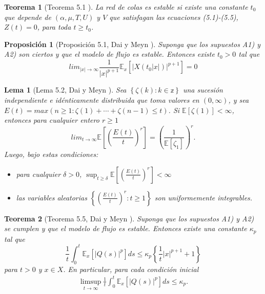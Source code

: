 \documentclass{article}
\newtheorem{Teo}{Teorema}
\newtheorem{Prop}{Proposición}
\newtheorem{Lemma}{Lema}
\newcommand{\esp}{\mathbb{E}}
\begin{document}
\begin{Teo}[Teorema 5.1 \cite{Chen}]\label{Tma.5.1.Chen}
La red de colas es estable si existe una constante $t_{0}$ que
depende de $\left(\alpha,\mu,T,U\right)$ y $V$ que satisfagan las
ecuaciones (5.1)-(5.5), $Z\left(t\right)=0$, para toda $t\geq
t_{0}$.
\end{Teo}

\begin{Prop}[Proposici\'on 5.1, Dai y Meyn \cite{DaiSean}]\label{Prop.5.1.DaiSean}
Suponga que los supuestos A1) y A2) son ciertos y que el modelo de flujo es estable. Entonces existe $t_{0}>0$ tal que
\begin{equation}
lim_{|x|\rightarrow\infty}\frac{1}{|x|^{p+1}}\esp_{x}\left[|X\left(t_{0}|x|\right)|^{p+1}\right]=0
\end{equation}
\end{Prop}

\begin{Lemma}[Lema 5.2, Dai y Meyn \cite{DaiSean}]\label{Lema.5.2.DaiSean}
 Sea $\left\{\zeta\left(k\right):k\in \mathbb{z}\right\}$ una sucesi\'on independiente e id\'enticamente distribuida que toma valores en $\left(0,\infty\right)$,
y sea
$E\left(t\right)=max\left(n\geq1:\zeta\left(1\right)+\cdots+\zeta\left(n-1\right)\leq
t\right)$. Si $\esp\left[\zeta\left(1\right)\right]<\infty$,
entonces para cualquier entero $r\geq1$
\begin{equation}
 lim_{t\rightarrow\infty}\esp\left[\left(\frac{E\left(t\right)}{t}\right)^{r}\right]=\left(\frac{1}{\esp\left[\zeta_{1}\right]}\right)^{r}.
\end{equation}
Luego, bajo estas condiciones:
\begin{itemize}
 \item[a)] para cualquier $\delta>0$, $\sup_{t\geq\delta}\esp\left[\left(\frac{E\left(t\right)}{t}\right)^{r}\right]<\infty$
\item[b)] las variables aleatorias
$\left\{\left(\frac{E\left(t\right)}{t}\right)^{r}:t\geq1\right\}$
son uniformemente integrables.
\end{itemize}
\end{Lemma}

\begin{Teo}[Teorema 5.5, Dai y Meyn \cite{DaiSean}]\label{Tma.5.5.DaiSean}
Suponga que los supuestos A1) y A2) se cumplen y que el modelo de
flujo es estable. Entonces existe una constante $\kappa_{p}$ tal
que
\begin{equation}
\frac{1}{t}\int_{0}^{t}\esp_{x}\left[|Q\left(s\right)|^{p}\right]ds\leq\kappa_{p}\left\{\frac{1}{t}|x|^{p+1}+1\right\}
\end{equation}
para $t>0$ y $x\in X$. En particular, para cada condici\'on
inicial
\begin{eqnarray*}
\limsup_{t\rightarrow\infty}\frac{1}{t}\int_{0}^{t}\esp_{x}\left[|Q\left(s\right)|^{p}\right]ds\leq\kappa_{p}.
\end{eqnarray*}
\end{Teo}
\end{document}
